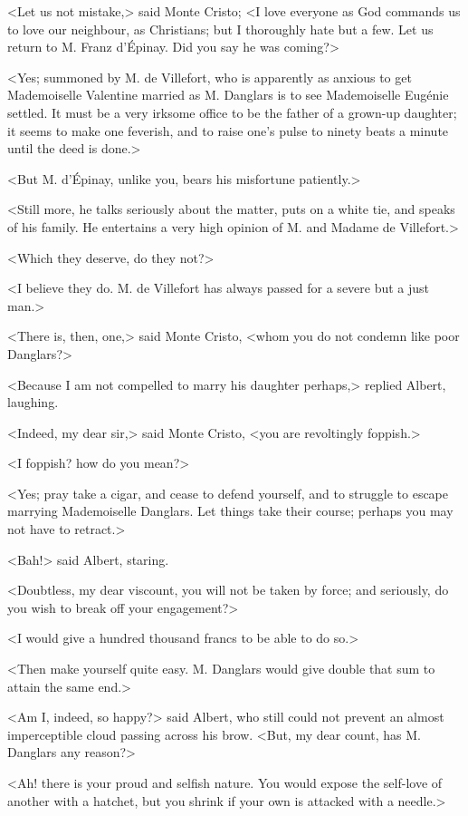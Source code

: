  <Let us not mistake,> said Monte Cristo; <I love everyone as God commands us to love our neighbour, as Christians; but I thoroughly hate but a few. Let us return to M. Franz d'Épinay. Did you say he was coming?> 

 <Yes; summoned by M. de Villefort, who is apparently as anxious to get Mademoiselle Valentine married as M. Danglars is to see Mademoiselle Eugénie settled. It must be a very irksome office to be the father of a grown-up daughter; it seems to make one feverish, and to raise one's pulse to ninety beats a minute until the deed is done.> 

 <But M. d'Épinay, unlike you, bears his misfortune patiently.> 

 <Still more, he talks seriously about the matter, puts on a white tie, and speaks of his family. He entertains a very high opinion of M. and Madame de Villefort.> 

 <Which they deserve, do they not?> 

 <I believe they do. M. de Villefort has always passed for a severe but a just man.> 

 <There is, then, one,> said Monte Cristo, <whom you do not condemn like poor Danglars?> 

 <Because I am not compelled to marry his daughter perhaps,> replied Albert, laughing. 

 <Indeed, my dear sir,> said Monte Cristo, <you are revoltingly foppish.> 

 <I foppish? how do you mean?> 

 <Yes; pray take a cigar, and cease to defend yourself, and to struggle to escape marrying Mademoiselle Danglars. Let things take their course; perhaps you may not have to retract.> 

 <Bah!> said Albert, staring. 

 <Doubtless, my dear viscount, you will not be taken by force; and seriously, do you wish to break off your engagement?> 

 <I would give a hundred thousand francs to be able to do so.> 

 <Then make yourself quite easy. M. Danglars would give double that sum to attain the same end.> 

 <Am I, indeed, so happy?> said Albert, who still could not prevent an almost imperceptible cloud passing across his brow. <But, my dear count, has M. Danglars any reason?> 

 <Ah! there is your proud and selfish nature. You would expose the self-love of another with a hatchet, but you shrink if your own is attacked with a needle.> 

